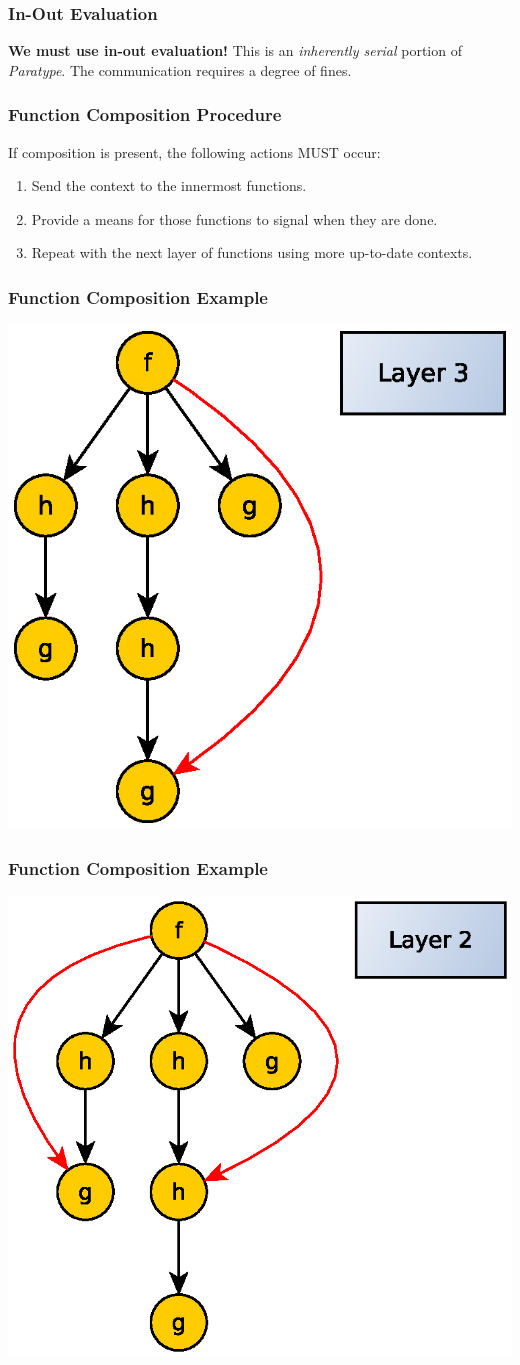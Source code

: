 \documentclass{beamer}
\begin{document}
\begin{frame}[fragile]
  \frametitle{In-Out Evaluation}
  \textbf{We must use in-out evaluation!} This is an \emph{inherently
    serial} portion of \emph{Paratype}. The communication requires a
  degree of fines.
\end{frame}

\begin{frame}[fragile]
  \frametitle{Function Composition Procedure}

  If composition is present, the following actions MUST occur:
  \begin{multicols}{2}
    \begin{enumerate}
      \item Send the context to the innermost functions.
      \item Provide a means for those functions to signal when they
        are done.
      \item Repeat with the next layer of functions using more
        up-to-date contexts.
    \end{enumerate}
  \end{multicols}
\end{frame}

\begin{frame}
  \frametitle{Function Composition Example}
  \centerline{\includegraphics[width=.6\linewidth]{media/inout3.eps}}
\end{frame}

\begin{frame}
  \frametitle{Function Composition Example}
  \centerline{\includegraphics[width=.6\linewidth]{media/inout2.eps}}
\end{frame}
\end{document}

